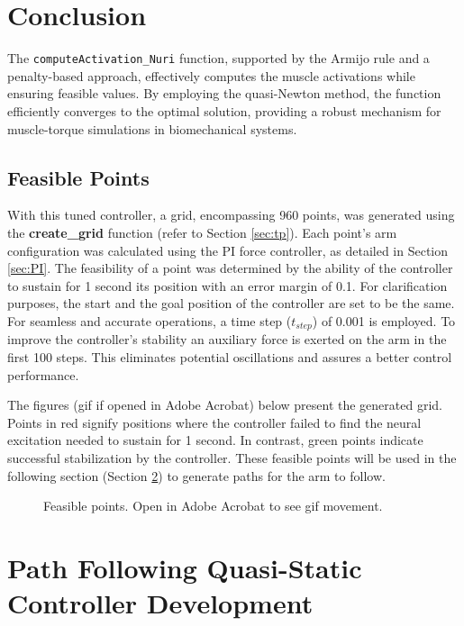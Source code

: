 \section{Conclusion}

The \texttt{computeActivation\_Nuri} function, supported by the Armijo rule and a penalty-based approach, effectively computes the muscle activations while ensuring feasible values. By employing the quasi-Newton method, the function efficiently converges to the optimal solution, providing a robust mechanism for muscle-torque simulations in biomechanical systems.
            

\subsection{Feasible Points}
With this tuned controller, a grid, encompassing 960 points, was generated using the \textbf{create\_grid} function (refer to Section \ref{sec:tp}). Each point's arm configuration was calculated using the PI force controller, as detailed in Section \ref{sec:PI}. The feasibility of a point was determined by the ability of the controller to sustain for 1 second its position with an error margin of 0.1. For clarification purposes, the start and the goal position of the controller are set to be the same. 
For seamless and accurate operations, a time step (\(t_{step}\)) of 0.001 is employed. To improve the controller's stability an auxiliary force is exerted on the arm in the first 100 steps. This eliminates potential oscillations and assures a better control performance.

The figures (gif if opened in Adobe Acrobat) below present the generated grid. Points in red signify positions where the controller failed to find the neural excitation needed to sustain for 1 second. In contrast, green points indicate successful stabilization by the controller. These feasible points will be used in the following section (Section \ref{sec:path}) to generate paths for the arm to follow. 


\begin{figure}[ht]
    \centering
    \caption{Feasible points. Open in Adobe Acrobat to see gif movement.}
    
\end{figure}
\section{Path Following Quasi-Static Controller Development } \label{sec:path}

